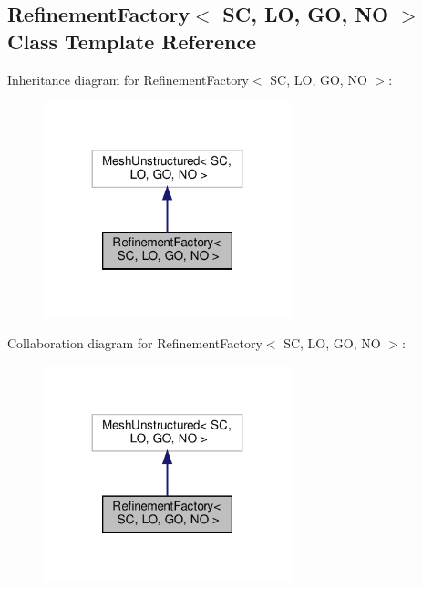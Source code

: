 \hypertarget{classFEDD_1_1RefinementFactory}{}\subsection{Refinement\+Factory$<$ SC, LO, GO, NO $>$ Class Template Reference}
\label{classFEDD_1_1RefinementFactory}


Inheritance diagram for Refinement\+Factory$<$ SC, LO, GO, NO $>$\+:\nopagebreak
\begin{figure}[H]
\begin{center}
\leavevmode
\includegraphics[width=203pt]{classFEDD_1_1RefinementFactory__inherit__graph}
\end{center}
\end{figure}


Collaboration diagram for Refinement\+Factory$<$ SC, LO, GO, NO $>$\+:\nopagebreak
\begin{figure}[H]
\begin{center}
\leavevmode
\includegraphics[width=203pt]{classFEDD_1_1RefinementFactory__coll__graph}
\end{center}
\end{figure}
